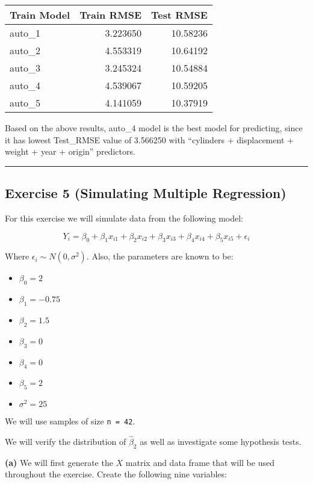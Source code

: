 \documentclass[
]{article}
\providecommand{\tightlist}{%
  \setlength{\itemsep}{0pt}\setlength{\parskip}{0pt}}
\begin{document}
\begin{longtable}[]{@{}lrr@{}}
\toprule
Train Model & Train RMSE & Test RMSE\tabularnewline
\midrule
\endhead
auto\_1 & 3.223650 & 10.58236\tabularnewline
auto\_2 & 4.553319 & 10.64192\tabularnewline
auto\_3 & 3.245324 & 10.54884\tabularnewline
auto\_4 & 4.539067 & 10.59205\tabularnewline
auto\_5 & 4.141059 & 10.37919\tabularnewline
\bottomrule
\end{longtable}

Based on the above results, auto\_4 model is the best model for
predicting, since it has lowest Test\_RMSE value of 3.566250 with
``cylinders + displacement + weight + year + origin'' predictors.

\begin{center}\rule{0.5\linewidth}{0.5pt}\end{center}

\hypertarget{exercise-5-simulating-multiple-regression}{%
\subsection{Exercise 5 (Simulating Multiple
Regression)}\label{exercise-5-simulating-multiple-regression}}

For this exercise we will simulate data from the following model:

\[
Y_i = \beta_0 + \beta_1 x_{i1} + \beta_2 x_{i2} + \beta_3 x_{i3} + \beta_4 x_{i4} + \beta_5 x_{i5} + \epsilon_i
\]

Where \(\epsilon_i \sim N(0, \sigma^2).\) Also, the parameters are known
to be:

\begin{itemize}
\tightlist
\item
  \(\beta_0 = 2\)
\item
  \(\beta_1 = -0.75\)
\item
  \(\beta_2 = 1.5\)
\item
  \(\beta_3 = 0\)
\item
  \(\beta_4 = 0\)
\item
  \(\beta_5 = 2\)
\item
  \(\sigma^2 = 25\)
\end{itemize}

We will use samples of size \texttt{n\ =\ 42}.

We will verify the distribution of \(\hat{\beta}_2\) as well as
investigate some hypothesis tests.

\textbf{(a)} We will first generate the \(X\) matrix and data frame that
will be used throughout the exercise. Create the following nine
variables:
\end{document}
